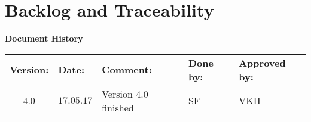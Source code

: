\cleartoleftpage
{
\Hide
\part{Backlog and Traceability}
}


\begin{center}
\textbf{\Large Document History}\\
\begin{tabular}{cllll}
\rowcolor{cadetgrey}
\textbf{Version:}    &\textbf{Date:} 	 &\textbf{Comment:}    &\textbf{Done by:}   &\textbf{Approved by:}  \\
4.0       & $17.05.17$   & Version 4.0 finished  & SF  & VKH \\
\end{tabular}                                                                   
\end{center}



\vspace*{3.0 cm}



\newpage
%

\setcounter{section}{0}
\setcounter{secnumdepth}{2}

\startcontents  
\setcounter{tocdepth}{2}
\chapter*{\contentsname}

\vspace*{1cm}

\vspace*{1cm}
\newpage





\newpage


\newpage


\newpage


\newpage

\stopcontents
{}
